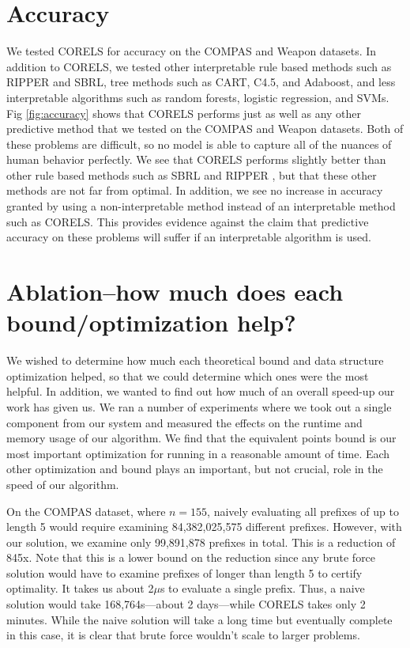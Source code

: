 \section{Accuracy}
We tested CORELS for accuracy on the COMPAS and Weapon datasets.
In addition to CORELS, we tested other interpretable rule based methods such as RIPPER and SBRL, tree methods such as CART, C4.5, and Adaboost, and less interpretable algorithms such as random forests, logistic regression, and SVMs.
Fig \ref{fig:accuracy} shows that CORELS performs just as well as any other predictive method that we tested on the COMPAS and Weapon datasets.
Both of these problems are difficult, so no model is able to capture all of the nuances of human behavior perfectly.
We see that CORELS performs slightly better than other rule based methods such as SBRL and RIPPER \cite{YangRuSe16}, but that these other methods are not far from optimal.
In addition, we see no increase in accuracy granted by using a non-interpretable method instead of an interpretable method such as CORELS.
This provides evidence against the claim that predictive accuracy on these problems will suffer if an interpretable algorithm is used.

\section{Ablation--how much does each bound/optimization help?}
We wished to determine how much each theoretical bound and data structure optimization helped, so that we could determine which ones were the most helpful.
In addition, we wanted to find out how much of an overall speed-up our work has given us.
We ran a number of experiments where we took out a single component from our system and measured the effects on the runtime and memory usage of our algorithm.
We find that the equivalent points bound is our most important optimization for running in a reasonable amount of time.
Each other optimization and bound plays an important, but not crucial, role in the speed of our algorithm.

On the COMPAS dataset, where $n = 155$, naively evaluating all prefixes of up to length 5 would require examining 84,382,025,575 different prefixes.
However, with our solution, we examine only 99,891,878 prefixes in total.
This is a reduction of 845x.
Note that this is a lower bound on the reduction since any brute force solution would have to examine prefixes of longer than length 5 to certify optimality.
It takes us about 2$\mu$s to evaluate a single prefix.
Thus, a naive solution would take 168,764s---about 2 days---while CORELS takes only 2 minutes.
While the naive solution will take a long time but eventually complete in this case, it is clear that brute force wouldn't scale to larger problems.

